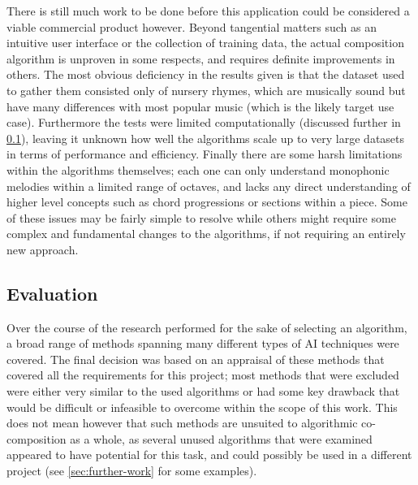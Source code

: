 \documentclass[ author={Stephen Livermore-Tozer},
				supervisor={Dr. Peter Flach},
				degree={MEng},
				title={Algorithmic Co-composition Using Machine Learning},
				subtitle={},
				type={research},
				year={2016} ]{dissertation}
\begin{document}
	There is still much work to be done before this application could be considered a viable commercial product however. Beyond tangential matters such as an intuitive user interface or the collection of training data, the actual composition algorithm is unproven in some respects, and requires definite improvements in others. The most obvious deficiency in the results given is that the dataset used to gather them consisted only of nursery rhymes, which are musically sound but have many differences with most popular music (which is the likely target use case). Furthermore the tests were limited computationally (discussed further in \ref{sec:project-evaluation}), leaving it unknown how well the algorithms scale up to very large datasets in terms of performance and efficiency. Finally there are some harsh limitations within the algorithms themselves; each one can only understand monophonic melodies within a limited range of octaves, and lacks any direct understanding of higher level concepts such as chord progressions or sections within a piece. Some of these issues may be fairly simple to resolve while others might require some complex and fundamental changes to the algorithms, if not requiring an entirely new approach.
	
	
	\subsection{Evaluation}
	\label{sec:project-evaluation}
	
	Over the course of the research performed for the sake of selecting an algorithm, a broad range of methods spanning many different types of AI techniques were covered. The final decision was based on an appraisal of these methods that covered all the requirements for this project; most methods that were excluded were either very similar to the used algorithms or had some key drawback that would be difficult or infeasible to overcome within the scope of this work. This does not mean however that such methods are unsuited to algorithmic co-composition as a whole, as several unused algorithms that were examined appeared to have potential for this task, and could possibly be used in a different project (see \ref{sec:further-work} for some examples).
	
\end{document}
